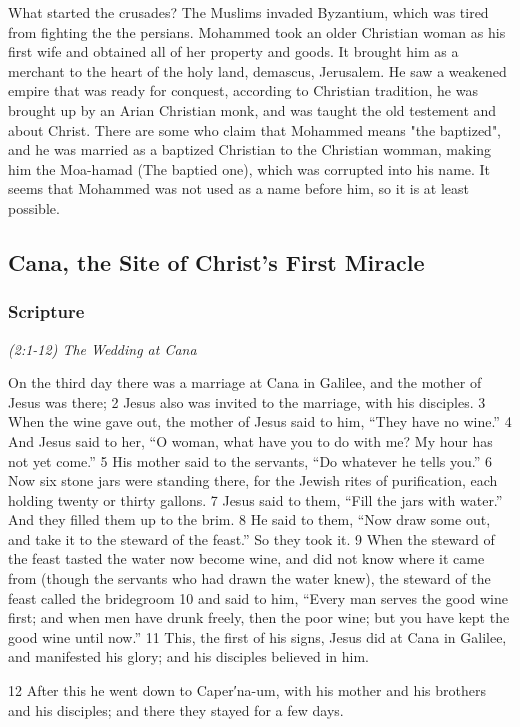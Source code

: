 \documentclass[letterpaper]{report}
\begin{document}
What started the crusades?
The Muslims invaded Byzantium, which was tired from fighting the the persians.
Mohammed took an older Christian woman as his first wife and obtained all of her property and goods. It brought him as a merchant to the heart of the holy land, demascus, Jerusalem.  He saw a weakened empire that was ready for conquest, according to Christian tradition, he was brought up by an Arian Christian monk, and was taught the old testement and about Christ. There are some who claim that Mohammed means "the baptized", and he was married as a baptized Christian to the Christian womman, making him the  Moa-hamad (The baptied one), which was corrupted into his name. It seems that Mohammed was not used as a name before him, so it is at least possible.


\clearpage
\subsection{Cana, the Site of Christ's First Miracle}
\begin{multicols}{2}
	\mbox{}
\end{multicols}
\subsubsection{Scripture}

{\centering
	\emph{(2:1-12) The Wedding at Cana}\\
}
\begin{multicols}{2}
On the third day there was a marriage at Cana in Galilee, and the mother of Jesus was there; 2 Jesus also was invited to the marriage, with his disciples. 3 When the wine gave out, the mother of Jesus said to him, “They have no wine.” 4 And Jesus said to her, “O woman, what have you to do with me? My hour has not yet come.” 5 His mother said to the servants, “Do whatever he tells you.” 6 Now six stone jars were standing there, for the Jewish rites of purification, each holding twenty or thirty gallons. 7 Jesus said to them, “Fill the jars with water.” And they filled them up to the brim. 8 He said to them, “Now draw some out, and take it to the steward of the feast.” So they took it. 9 When the steward of the feast tasted the water now become wine, and did not know where it came from (though the servants who had drawn the water knew), the steward of the feast called the bridegroom 10 and said to him, “Every man serves the good wine first; and when men have drunk freely, then the poor wine; but you have kept the good wine until now.” 11 This, the first of his signs, Jesus did at Cana in Galilee, and manifested his glory; and his disciples believed in him.

12 After this he went down to Caper′na-um, with his mother and his brothers and his disciples; and there they stayed for a few days.
\end{multicols}
\end{document}
